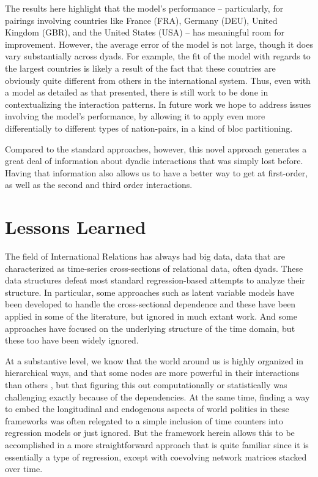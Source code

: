 \documentclass[3p,times,twocolumn,authoryear,12pt]{elsarticle}
\begin{document}
The results here highlight that the model's performance -- particularly, for pairings involving countries like France (FRA), Germany (DEU), United Kingdom (GBR), and the United States (USA) -- has meaningful room for improvement.  However, the average error of the model is not large, though it does vary substantially across dyads.  For example, the  fit of the model with regards to the largest countries is likely a result of the fact that these countries are obviously quite different from others in the international system. Thus, even with a model as detailed as that presented, there is still work to be done in contextualizing the interaction patterns. In future work we hope to address issues involving the model's performance, by allowing it to apply even more differentially to different types of nation-pairs, in a kind of bloc partitioning. 

Compared to the standard approaches, however, this novel approach generates a great deal of information about dyadic interactions that was simply lost before. Having that information also allows us to have a better way to get at first-order, as well as the second and third order interactions.

\section{Lessons Learned}

The field of International Relations has always had big data, data that are characterized as time-series cross-sections of relational data, often dyads. These data structures defeat most standard regression-based attempts to analyze their structure. In particular, some approaches such as latent variable models have been developed to handle the cross-sectional dependence and these have been applied in some of the literature, but ignored in much extant work. And some approaches have focused on the underlying structure of the time domain, but these too have been widely ignored. 

At a substantive level, we know that the world around us is highly organized in hierarchical ways, and that some nodes are more powerful in their interactions than others \citep{house:ward:1988,house:ward:1988a}, but that figuring this out computationally or statistically was challenging exactly because of the dependencies. At the same time, finding a way to embed the longitudinal and endogenous aspects of world politics in these frameworks was often relegated to a simple inclusion of time counters into regression models or just ignored. But the framework herein allows this to be accomplished in a more straightforward approach that is quite familiar since it is essentially a type of regression, except with coevolving network matrices stacked over time.  
\end{document}
